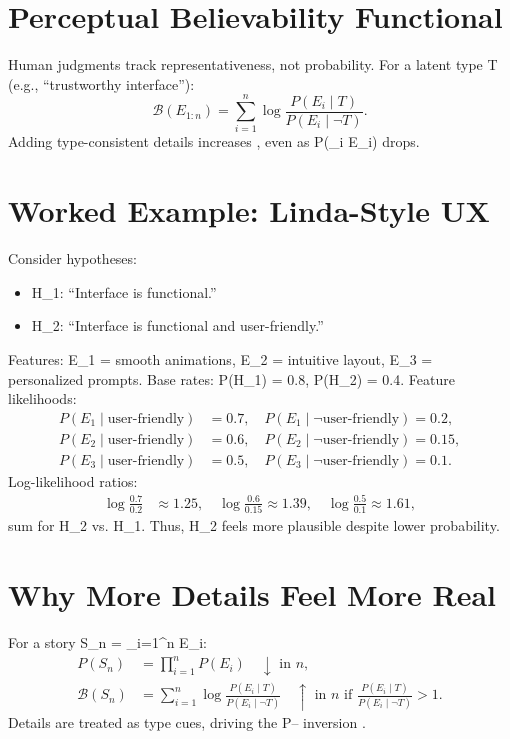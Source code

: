 \documentclass[openany]{book}
\begin{document}
\section{Perceptual Believability Functional}
\label{sec:conj-believability}
Human judgments track representativeness, not probability. For a latent type T (e.g., \textquotedblleft trustworthy interface\textquotedblright):
\begin{equation}
\label{eq:believability-functional}
\mathcal{B}(E_{1:n}) = \sum_{i=1}^n \log \frac{P(E_i \mid T)}{P(E_i \mid \neg T)}.
\end{equation}
Adding type-consistent details increases , even as P(\bigwedge_i E_i) drops.

\section{Worked Example: Linda-Style UX}
\label{sec:conj-example}
Consider hypotheses:
\begin{itemize}
  \item H_1: \textquotedblleft Interface is functional.\textquotedblright
  \item H_2: \textquotedblleft Interface is functional and user-friendly.\textquotedblright
\end{itemize}
Features: E_1 = smooth animations, E_2 = intuitive layout, E_3 = personalized prompts. Base rates: P(H_1) = 0.8, P(H_2) = 0.4. Feature likelihoods:
\begin{align*}
P(E_1 \mid \text{user-friendly}) &= 0.7, \quad P(E_1 \mid \neg \text{user-friendly}) = 0.2, \\
P(E_2 \mid \text{user-friendly}) &= 0.6, \quad P(E_2 \mid \neg \text{user-friendly}) = 0.15, \\
P(E_3 \mid \text{user-friendly}) &= 0.5, \quad P(E_3 \mid \neg \text{user-friendly}) = 0.1.
\end{align*}
Log-likelihood ratios:
\begin{align*}
\log \frac{0.7}{0.2} &\approx 1.25, \quad \log \frac{0.6}{0.15} \approx 1.39, \quad \log \frac{0.5}{0.1} \approx 1.61,
\end{align*}
sum  for H_2 vs. H_1. Thus, H_2 feels more plausible despite lower probability.

\section{Why More Details Feel More Real}
\label{sec:conj-why}
For a story S_n = \bigwedge_{i=1}^n E_i:
\begin{align*}
P(S_n) &= \prod_{i=1}^n P(E_i) \quad \downarrow \text{ in } n, \\
\mathcal{B}(S_n) &= \sum_{i=1}^n \log \frac{P(E_i \mid T)}{P(E_i \mid \neg T)} \quad \uparrow \text{ in } n \text{ if } \frac{P(E_i \mid T)}{P(E_i \mid \neg T)} > 1.
\end{align*}
Details are treated as type cues, driving the P-- inversion \citep{tversky1983}.
\end{document}
